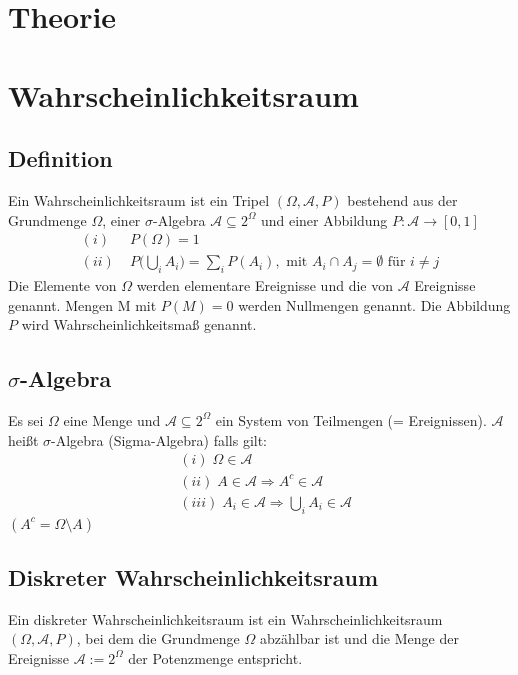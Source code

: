 \documentclass[a4paper]{article}
\begin{document}
\tableofcontents
\pagebreak
\section*{Theorie}
\setlength{\parindent}{0em}

\section{Wahrscheinlichkeitsraum}

\subsection{Definition}
Ein Wahrscheinlichkeitsraum ist ein Tripel $(\Omega, \mathcal{A}, P)$ bestehend aus der Grundmenge $\Omega$, einer $\sigma$-Algebra $\mathcal{A} \subseteq  2^{\Omega}$ und einer Abbildung
$P : \mathcal{A} \to [0,1]$
\begin{align*}
(i) & \; P(\Omega) = 1 \\
(ii) & \;  P \biggl(  \bigcup_i A_i  \biggr) = \sum_i P(A_i), \text{ mit } A_i \cap A_j = \emptyset \text{ für } i \neq j
\end{align*}
Die Elemente von $\Omega$ werden elementare Ereignisse und die von $\mathcal{A}$ Ereignisse genannt. Mengen M mit $P(M) = 0$ werden Nullmengen genannt.
Die Abbildung $P$ wird Wahrscheinlichkeitsmaß genannt.

\subsection{$\sigma$-Algebra}
Es sei $\Omega$ eine Menge und $\mathcal{A} \subseteq  2^{\Omega}$ ein System von Teilmengen (= Ereignissen). $\mathcal{A}$ heißt $\sigma$-Algebra (Sigma-Algebra) falls gilt:
\begin{align*}
& (i) \; \Omega \in \mathcal{A} \\
& (ii) \; A \in \mathcal{A} \Rightarrow A^c \in \mathcal{A} \\
& (iii) \; A_i \in \mathcal{A} \Rightarrow \bigcup_i A_i \in \mathcal{A} 
\end{align*}
$(A^c = \Omega \setminus A)$

\subsection{Diskreter Wahrscheinlichkeitsraum}
Ein diskreter Wahrscheinlichkeitsraum ist ein Wahrscheinlichkeitsraum $(\Omega, \mathcal{A}, P)$, bei dem die Grundmenge $\Omega$ abzählbar ist und die Menge der Ereignisse $\mathcal{A} := 2^{\Omega}$ der Potenzmenge entspricht.
\end{document}
